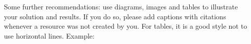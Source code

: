 \documentclass[
thesis%
]{csthes}
\begin{document}









Some further recommendations: use diagrams, images and tables to illustrate your solution and results. If you do so, please add captions with citations whenever a resource was not created by you. For tables, it is a good style not to use horizontal lines. Example:
\end{document}
